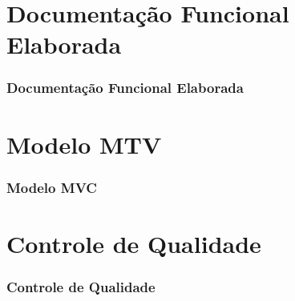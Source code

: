 \documentclass{fancyslides}
\begin{document}
\begin{frame}

\end{frame}

\begin{frame}

\end{frame}

\begin{frame}

\end{frame}

\section{Documentação Funcional Elaborada}
\begin{frame}\frametitle{Documentação Funcional Elaborada}
\end{frame}

\section{Modelo MTV}
\begin{frame}\frametitle{Modelo MVC}
	
\end{frame}

\section{Controle de Qualidade}
\begin{frame}\frametitle{Controle de Qualidade}

\end{frame}

\end{document}
